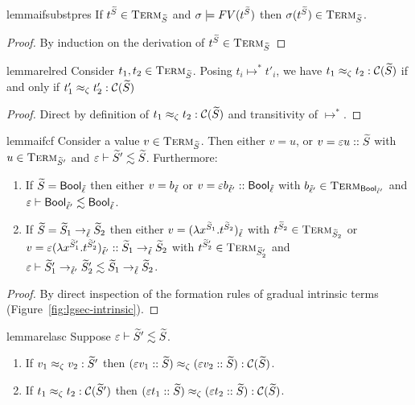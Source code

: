 \documentclass[authoryear,sort&compress,9pt,twocolumn,nocopyrightspace]{sigplanconf}
\newcommand{\Bool}{\mathsf{Bool}}
\newcommand{\oblset}[1]{\textsc{#1}}
\newcommand{\csub}{\lesssim}
\newcommand{\?}{\textsf{\upshape ?}} \newcommand{\consistent}[1]{\widetilde{#1}}
\newcommand{\TermT}[1]{\oblset{Term}_{#1}}
\newcommand{\cast}[2]{\evcast{\evpr{#1}}{#2}}
\newcommand{\red}{\longmapsto}
\newcommand{\ev}{\varepsilon}
\newcommand{\evcast}[2]{#1#2}
\newcommand{\evpr}[1]{\braket{#1}}
\newcommand{\lobs}{\zeta}
\newcommand{\rel}{\approx_{\lobs}}
\newcommand{\rcomp}[1]{\mathcal{C}(#1)}
\newcommand{\subst}{\sigma}
\newcommand{\itm}[1]{{t^{\cS_{#1}}}}
\renewcommand{\cast}[2]{#1#2}
\begin{document}
\begin{restatable}{lemma}{ifsubstpres}
\label{lm:if-subst-pres}
If $\itm{} \in \TermT{\cS}$ and $ \subst |= FV(\itm{})$ then
$\subst(\itm{}) \in \TermT{\cS}$.
\end{restatable}
\begin{proof}
By induction on the derivation of $\itm{} \in \TermT{\cS}$
\end{proof}

\begin{restatable}{lemma}{relred}
\label{lm:relred}
Consider $t_1, t_2 \in \TermT{\cS}$. Posing $t_i \red^{*} t'_i$, we have
$t_1 \rel t_2 : \rcomp{\cS}$ if and only if $t'_1 \rel t'_2 : \rcomp{\cS}$
\end{restatable}
\begin{proof}
Direct by definition of $t_1 \rel t_2 : \rcomp{\cS}$ and transitivity
of $\red^{*}$.
\end{proof}

\begin{restatable}{lemma}{ifcf}
\label{lm:ifcf}
Consider a value $v \in \TermT{\cS}$. Then either $v = u$, or $v =
\cast{\ev}{u} :: \cS$ with $u \in \TermT{\cS'}$ and $\ev |- \cS' \csub \cS$. Furthermore:
\begin{enumerate}
\item If $\cS = \Bool_\clx$ then either $v=b_{\tilde{\ell}}$ or
$v=\cast{\ev}{b_{\clx'} :: \Bool_\clx}$ with $b_{\clx'} \in
\TermT{\Bool_{\clx'}}$ and 
$\ev |- \Bool_{\clx'}
\csub \Bool_\clx$.
\item  If $\cS = \cS_1 ->_{\clx} \cS_2$ then either 
$v=(\lambda x^{\cS_1}.\itm{2})_\clx$ with $\itm{2} \in \TermT{\cS_2}$ or
$v=\cast{\ev}{(\lambda x^{\cS'_1}.t^{\cS'_2})_{\clx'} :: \cS_1 ->_{\clx} \cS_2 }$
with $t^{\cS'_2} \in \TermT{\cS'_2}$ and 
$\ev |-  \cS'_1 ->_{\clx'} \cS'_2
\csub  \cS_1 ->_{\clx} \cS_2$.
\end{enumerate}
\end{restatable}
\begin{proof}
By direct inspection of the formation rules of gradual intrinsic terms (Figure~\ref{fig:lgsec-intrinsic}).
\end{proof}

\begin{restatable}{lemma}{relasc}
\label{lm:relasc} Suppose $\ev |- \cS' \csub \cS$.
\begin{enumerate}
\item If $v_1 \rel v_2 : \cS'$ then 
$(\cast{\ev}{v_1 :: \cS}) \rel (\cast{\ev}{v_2 :: \cS}) :\rcomp{\cS}$.
\item If $t_1 \rel t_2 : \rcomp{\cS'}$ then $(\cast{\ev}{t_1 :: \cS}) \rel (\cast{\ev}{t_2 :: \cS}) :\rcomp{\cS}$.
\end{enumerate}
\end{restatable}
\end{document}
